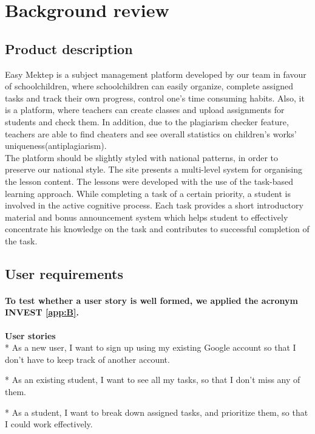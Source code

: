 \chapter{Background review}\label{ch:A}
\section{Product description}
Easy Mektep is a subject management platform developed by our team in favour of schoolchildren, where schoolchildren can easily organize, complete assigned tasks and track their own progress, control one's time consuming habits. Also, it is a platform, where teachers can create classes and upload assignments for students and check them. In addition, due to the plagiarism checker feature, teachers are able to find cheaters and see overall statistics on children's works' uniqueness(antiplagiarism).  \\
The platform should be slightly styled with national patterns, in order to preserve our national style. 
The site presents a multi-level system for organising the lesson content. The lessons were developed with the use of the task-based learning approach. While completing a task of a certain priority, a student is involved in the active cognitive process. Each task provides a short introductory material and bonus announcement system which helps student to effectively concentrate his knowledge on the task and contributes to successful completion of the task.
\section{User requirements }
\vspace{0.4cm}
\subsubsection{To test whether a user story is well formed, we applied the acronym INVEST \cref{app:B}.\cite{buglione2013improving}}
\vspace{1cm}
\large \textbf{User stories}
\vspace{0.4cm}\\
* As a new user, I want to sign up using my existing Google account so that I don't have to keep track of another account.

* As an existing student, I want to see all my tasks, so that I don't miss any of them.

* As a student, I want to break down assigned tasks, and prioritize them, so that I could work effectively.

